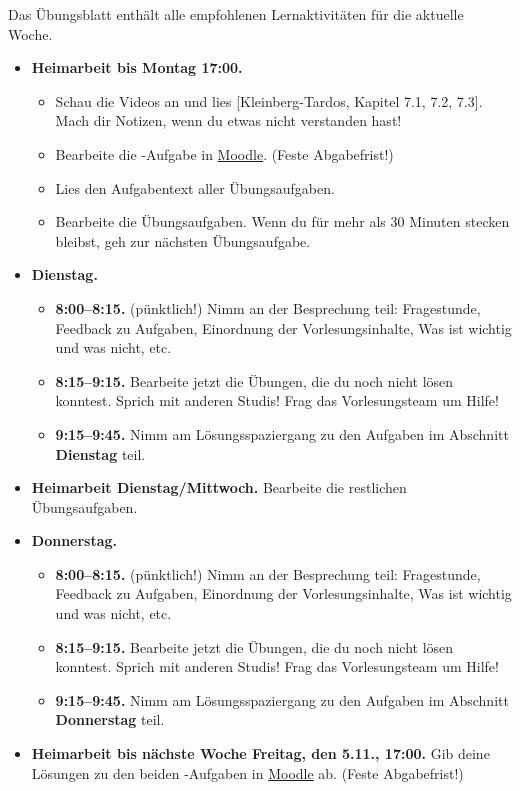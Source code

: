 \documentclass{uebung_cs}
\begin{document}
Das Übungsblatt enthält alle empfohlenen Lernaktivitäten für die aktuelle Woche.

\begin{itemize}
\item \textbf{Heimarbeit bis Montag 17:00.}
    \begin{itemize}
    \item 
    Schau die Videos an und lies [Kleinberg-Tardos, Kapitel 7.1, 7.2, 7.3]. Mach dir Notizen, wenn du etwas nicht verstanden hast!
    \item Bearbeite die -Aufgabe in \href{https://moodle.studiumdigitale.uni-frankfurt.de/moodle/course/view.php?id=2241}{Moodle}. (Feste Abgabefrist!)
    \item Lies den Aufgabentext aller Übungsaufgaben.
    \item Bearbeite die Übungsaufgaben. Wenn du für mehr als 30 Minuten stecken bleibst, geh zur nächsten Übungsaufgabe.
    \end{itemize}
\item \textbf{Dienstag.}
\begin{itemize}
    \item \textbf{8:00--8:15.} (pünktlich!) Nimm an der Besprechung teil: Fragestunde, Feedback zu Aufgaben, Einordnung der Vorlesungsinhalte, Was ist wichtig und was nicht, etc.
    \item \textbf{8:15--9:15.} Bearbeite jetzt die Übungen, die du noch nicht lösen konntest. Sprich mit anderen Studis! Frag das Vorlesungsteam um Hilfe!
    \item \textbf{9:15--9:45.} Nimm am Lösungsspaziergang zu den Aufgaben im Abschnitt \textbf{Dienstag} teil.
\end{itemize}
\item \textbf{Heimarbeit Dienstag/Mittwoch.} Bearbeite die restlichen Übungsaufgaben.
\item \textbf{Donnerstag.}
    \begin{itemize}
        \item \textbf{8:00--8:15.} (pünktlich!) Nimm an der Besprechung teil: Fragestunde, Feedback zu Aufgaben, Einordnung der Vorlesungsinhalte, Was ist wichtig und was nicht, etc.
        \item \textbf{8:15--9:15.} Bearbeite jetzt die Übungen, die du noch nicht lösen konntest. Sprich mit anderen Studis! Frag das Vorlesungsteam um Hilfe!
        \item \textbf{9:15--9:45.} Nimm am Lösungsspaziergang zu den Aufgaben im Abschnitt \textbf{Donnerstag} teil.
    \end{itemize}
\item \textbf{Heimarbeit bis nächste Woche Freitag, den 5.11., 17:00.} Gib deine Lösungen zu den beiden -Aufgaben in \href{https://moodle.studiumdigitale.uni-frankfurt.de/moodle/course/view.php?id=2241}{Moodle} ab. (Feste Abgabefrist!)
\end{itemize}
\end{document}
